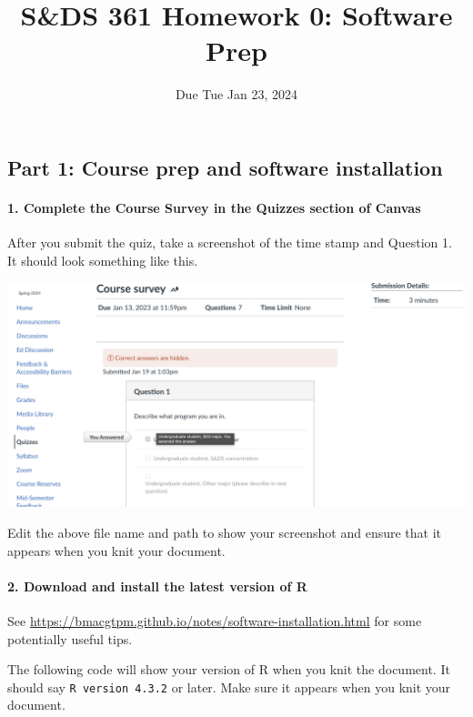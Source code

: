 \documentclass[
]{article}
\title{S\&DS 361 Homework 0: Software Prep}
\author{}
\date{\vspace{-2.5em}Due Tue Jan 23, 2024}
\newenvironment{Shaded}{\begin{snugshade}}{\end{snugshade}}
\newcommand{\FunctionTok}[1]{\textcolor[rgb]{0.13,0.29,0.53}{\textbf{#1}}}
\newcommand{\NormalTok}[1]{#1}
\newcommand{\SpecialCharTok}[1]{\textcolor[rgb]{0.81,0.36,0.00}{\textbf{#1}}}
\begin{document}
\maketitle

\subsection{Part 1: Course prep and software
installation}\label{part-1-course-prep-and-software-installation}

\paragraph{1. Complete the Course Survey in the Quizzes section of
Canvas}\label{complete-the-course-survey-in-the-quizzes-section-of-canvas}

After you submit the quiz, take a screenshot of the time stamp and
Question 1. It should look something like this.

\includegraphics{img/snip of Course Survey.png}

Edit the above file name and path to show your screenshot and ensure
that it appears when you knit your document.

\paragraph{2. Download and install the latest version of
R}\label{download-and-install-the-latest-version-of-r}

See \url{https://bmacgtpm.github.io/notes/software-installation.html}
for some potentially useful tips.

The following code will show your version of R when you knit the
document. It should say \texttt{R\ version\ 4.3.2} or later. Make sure
it appears when you knit your document.

\begin{Shaded}
\end{Shaded}
\end{document}
